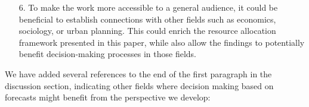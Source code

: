 \documentclass{article}
\begin{document}
\begin{quotebar}
\begin{enumerate}
  \item[6.] To make the work more accessible to a general audience, it could be beneficial to establish connections with other fields such as economics, sociology, or urban planning. This could enrich the resource allocation framework presented in this paper, while also allow the findings to potentially benefit decision-making processes in those fields.
\end{enumerate}
\end{quotebar}

We have added several references to the end of the first paragraph in the discussion section, indicating other fields where decision making based on forecasts 
might benefit from the perspective we develop:
\end{document}
